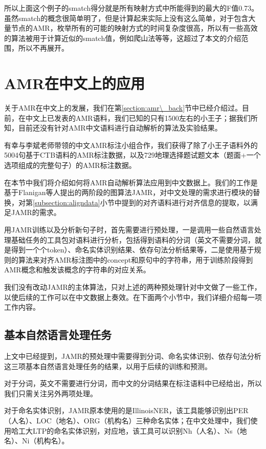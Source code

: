 \documentclass[master, winfont]{njuthesis}
\begin{document}
所以上面这个例子的smatch得分就是所有映射方式中所能得到的最大的F值0.73。虽然smatch的概念很简单明了，但是计算起来实际上没有这么简单，对于包含大量节点的AMR，枚举所有的可能的映射方式的时间复杂度很高，所以有一些高效的算法被用于计算近似的smatch值，例如爬山法等等，这超过了本文的介绍范围，所以不再展开。

\section{AMR在中文上的应用}
关于AMR在中文上的发展，我们在第\ref{section:amr\_back}节中已经介绍过。目前，在中文上已发表的AMR语料，我们已知的只有1500左右的小王子\cite{Li2016Annotating}；据我们所知，目前还没有针对AMR中文语料进行自动解析的算法及实验结果。

有幸与李斌老师带领的中文AMR标注小组合作，我们获得了除了小王子语料外的5004句基于CTB语料的AMR标注数据，以及729地理选择题试题文本（题面+一个选项组成的完整句子）的AMR标注数据。

在本节中我们将介绍如何将AMR自动解析算法应用到中文数据上。我们的工作是基于Flanigan等人\cite{Flanigan2014}提出的两阶段的图算法JAMR，对中文处理的需求进行模块的替换，对第\ref{subsection:aligndata}小节中提到的对齐语料进行对齐信息的提取，以满足JAMR的需求。

用JAMR训练以及分析新句子时，首先需要进行预处理，一是调用一些自然语言处理基础任务的工具包对语料进行分析，包括得到语料的分词（英文不需要分词，就是得到一个个token）、命名实体识别结果、依存句法分析结果等，二是使用基于规则的算法来对齐AMR标注图中的concept和原句中的字符串，用于训练阶段得到AMR概念和触发该概念的字符串的对应关系。

我们没有改动JAMR的主体算法，只对上述的两种预处理针对中文做了一些工作，以使后续的工作可以在中文数据上奏效。在下面两个小节中，我们详细介绍每一项工作内容。

\subsection{基本自然语言处理任务}
上文中已经提到，JAMR的预处理中需要得到分词、命名实体识别、依存句法分析这三项基本自然语言处理任务的结果，以用于后续的训练和预测。

对于分词，英文不需要进行分词，而中文的分词结果在标注语料中已经给出，所以我们只需关注另外两项处理。

对于命名实体识别，JAMR原本使用的是IllinoisNER，该工具能够识别出PER（人名）、LOC（地名）、ORG（机构名）三种命名实体；在中文处理中，我们使用哈工大LTP的命名实体识别，对应地，该工具可以识别Nh（人名）、Ns（地名）、Ni（机构名）。
\end{document}
